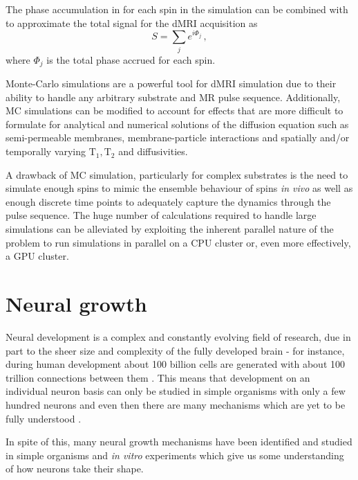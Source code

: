 The phase accumulation in  for each spin in the simulation can be combined with  to approximate the total signal for the \ac{dMRI} acquisition as
\begin{equation}
  S = \sum_j e^{i\Phi_j}\,,
  \label{eq:MCsignal}
\end{equation}
where $\Phi_j$ is the total phase accrued for each spin. 

Monte-Carlo simulations are a powerful tool for \ac{dMRI} simulation due to their ability to handle any arbitrary substrate and MR pulse sequence.
Additionally, \ac{MC} simulations can be modified to account for effects that are more difficult to formulate for analytical and numerical solutions of the diffusion equation such as semi-permeable membranes, membrane-particle interactions and spatially and/or temporally varying $\mathrm{T_1, T_2}$ and diffusivities.

A drawback of \ac{MC} simulation, particularly for complex substrates is the need to simulate enough spins to mimic the ensemble behaviour of spins \emph{in vivo} as well as enough discrete time points to adequately capture the dynamics through the pulse sequence.
The huge number of calculations required to handle large simulations can be alleviated by exploiting the inherent parallel nature of the problem to run simulations in parallel on a \ac{CPU} cluster or, even more effectively, a GPU cluster.

\section{Neural growth}
\label{sec:bg_nerual_growth}
Neural development is a complex and constantly evolving field of research, due in part to the sheer size and complexity of the fully developed brain - for instance, during human development about 100 billion cells are generated with about 100 trillion connections between them \cite{Price2017}. This means that development on an individual neuron basis can only be studied in simple organisms with only a few hundred neurons and even then there are many mechanisms which are yet to be fully understood \cite{Price2017}.

In spite of this, many neural growth mechanisms have been identified and studied in simple organisms and \emph{in vitro} experiments \cite{Price2017,Rauch2013,Nikic2011,Dent2011,Polleux2010,Lowery2009,Mortimer2008,Sakisaka2005,Scott2001,NAP1785} which give us some understanding of how neurons take their shape.

